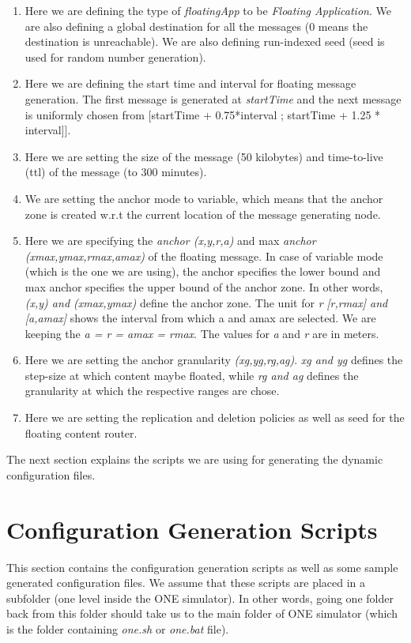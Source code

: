 \begin{enumerate}
  \item Here we are defining the type of \textit{floatingApp} to be \textit{Floating Application}. We are also defining a global destination for all the messages (0 means the destination is unreachable). We are also defining run-indexed seed (seed is used for random number generation).
  \item Here we are defining the start time and interval for floating message generation. The first message is generated at \textit{startTime} and the next message is uniformly chosen from [startTime + 0.75*interval ; startTime + 1.25 * interval]].
  \item Here we are setting the size of the message (50 kilobytes) and time-to-live (ttl) of the message (to 300 minutes).
  \item We are setting the anchor mode to variable, which means that the anchor zone is created w.r.t the current location of the message generating node.
  \item Here we are specifying the \textit{anchor (x,y,r,a)} and max \textit{anchor (xmax,ymax,rmax,amax)} of the floating message. In case of variable mode (which is the one we are using), the anchor specifies the lower bound and max anchor specifies the upper bound of the anchor zone. In other words, \textit{(x,y) and (xmax,ymax)} define the anchor zone. The unit for \textit{r} \textit{[r,rmax] and [a,amax]} shows the interval from which a and amax are selected. We are keeping the \textit{a = r = amax = rmax}. The values for \textit{a} and \textit{r} are in meters.
  \item Here we are setting the anchor granularity \textit{(xg,yg,rg,ag)}. \textit{xg and yg} defines the step-size at which content maybe floated, while \textit{rg and ag} defines the granularity at which the respective ranges are chose.
  \item Here we are setting the replication and deletion policies as well as seed for the floating content router.
\end{enumerate}
The next section explains the scripts we are using for generating the dynamic configuration files.

\section{Configuration Generation Scripts}
This section contains the configuration generation scripts as well as some sample generated configuration files. We assume that these scripts are placed in a subfolder (one level inside the ONE simulator). In other words, going one folder back from this folder should take us to the main folder of ONE simulator (which is the folder containing \textit{one.sh} or \textit{one.bat} file).

